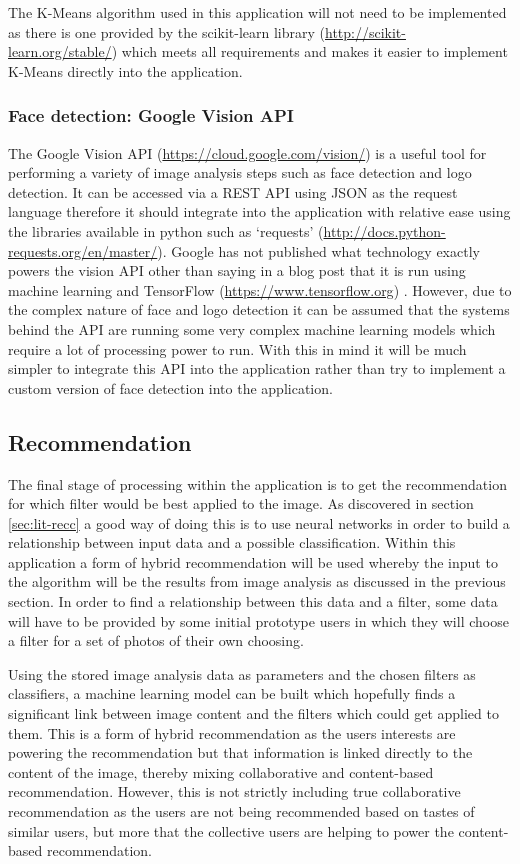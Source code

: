 \documentclass[a4paper,12pt]{report}
\begin{document}
        The K-Means algorithm used in this application will not need to be implemented as there is one provided by the scikit-learn library (\url{http://scikit-learn.org/stable/}) which meets all requirements and makes it easier to implement K-Means directly into the application.

      \subsubsection{Face detection: Google Vision API} \label{sec:visionapi}
        The Google Vision API (\url{https://cloud.google.com/vision/}) is a useful tool for performing a variety of image analysis steps such as face detection and logo detection. It can be accessed via a REST API using JSON as the request language therefore it should integrate into the application with relative ease using the libraries available in python such as ‘requests’ (\url{http://docs.python-requests.org/en/master/}). Google has not published what technology exactly powers the vision API other than saying in a blog post that it is run using machine learning and TensorFlow (\url{https://www.tensorflow.org}) \citep{vision2015blog}. However, due to the complex nature of face and logo detection it can be assumed that the systems behind the API are running some very complex machine learning models which require a lot of processing power to run. With this in mind it will be much simpler to integrate this API into the application rather than try to implement a custom version of face detection into the application.

    \subsection{Recommendation}
      The final stage of processing within the application is to get the recommendation for which filter would be best applied to the image.
      As discovered in section \ref{sec:lit-recc} a good way of doing this is to use neural networks in order to build a relationship between input data and a possible classification. Within this application a form of hybrid recommendation will be used whereby the input to the algorithm will be the results from image analysis as discussed in the previous section. In order to find a relationship between this data and a filter, some data will have to be provided by some initial prototype users in which they will choose a filter for a set of photos of their own choosing.

      Using the stored image analysis data as parameters and the chosen filters as classifiers, a machine learning model can be built which hopefully finds a significant link between image content and the filters which could get applied to them. This is a form of hybrid recommendation as the users interests are powering the recommendation but that information is linked directly to the content of the image, thereby mixing collaborative and content-based recommendation. However, this is not strictly including true collaborative recommendation as the users are not being recommended based on tastes of similar users, but more that the collective users are helping to power the content-based recommendation.
\end{document}

